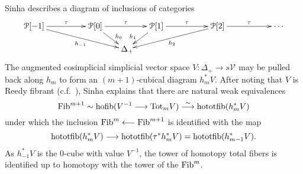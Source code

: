 \documentclass[11pt]{amsart} \renewcommand{\baselinestretch}{1.2}
\theoremstyle{plain}
\theoremstyle{definition}
\DeclareMathOperator*{\hofib}{hofib}
\renewcommand{\to}{\longrightarrow}
\newcommand{\from}{\longleftarrow}
\newcommand{\calP}{\mathcal{P}}
\newcommand{\calV}{\mathcal{V}}
\newcommand{\citeBOX}[2][]{\cite[\mbox{#1}]{#2}}
\newcommand{\vect}[2]{\calV^{#1}_{#2}}
\begin{document}
\begin{Conventions and notation}
Sinha describes a diagram of inclusions of categories
\[\xymatrix@!0@R=10mm@C=13mm{
\calP[-1]\ar[rr]^-{\tau}\ar_-{h_{-1}}[drrr]
&&%
\calP[0]\ar[rr]^-{\tau}\ar^(.65){\!h_{0}}[dr]
&&%
\calP[1]\ar[rr]^-{\tau}\ar_(.65){h_{1}\!}[dl]
&&%
\calP[2]\ar[rr]^-{\tau}\ar^-{h_{2}}[dlll]
&&%
\cdots \\
&&&\Delta_+\!\!
}\]
The augmented cosimplicial simplicial vector space $V:\Delta_+\to s\vect{}{}$ may be pulled back along $h_m$ to form an $(m+1)$-cubical diagram $h_m^*V$. After noting that $V$ is Reedy fibrant (c.f.\ \citeBOX[{X.4.9}]{YellowMonster}), Sinha explains that there are natural weak equivalences 
\[\textup{Fib}^{m+1}\sim\hofib(V^{-1}\to\textup{Tot}_mV) \overset{\smash{\sim}}{\to} \textup{hototfib}(h_m^*V)\]
under which the inclusion $\textup{Fib}^m\from \textup{Fib}^{m+1}$
is identified with the map
\[\textup{hototfib}(h_m^*V)\to \textup{hototfib}(\tau^*h_m^*V)=\textup{hototfib}(h_{m-1}^*V).\]
As $h_{-1}^*V$ is the 0-cube with value $V^{-1}$, the tower of homotopy total fibers is identified up to homotopy with the tower of the $\textup{Fib}^m$.


\end{Conventions and notation}
\end{document}
